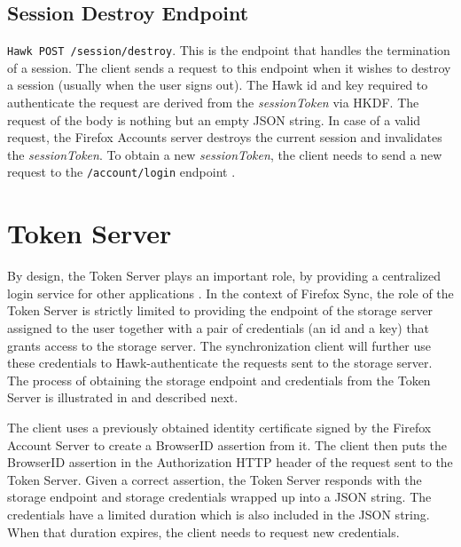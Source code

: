 \subsection{Session Destroy Endpoint}
\label{sub-sec:session-destroy-endpoint}

{\tt Hawk POST /session/destroy}. This is the endpoint that handles the termination of a session. The client sends a request to this endpoint when it wishes to destroy a session (usually when the user signs out). The Hawk id and key required to authenticate the request are derived from the \textit{sessionToken} via HKDF. The request of the body is nothing but an empty JSON string. In case of a valid request, the Firefox Accounts server destroys the current session and invalidates the \textit{sessionToken}. To obtain a new \textit{sessionToken}, the client needs to send a new request to the {\tt/account/login} endpoint \cite{fxa-server-docs}.

\section{Token Server}
\label{sec:token-server}

By design, the Token Server plays an important role, by providing a centralized login service for other applications \cite{token-server-docs}. In the context of Firefox Sync, the role of the Token Server is strictly limited to providing the endpoint of the storage server assigned to the user together with a pair of credentials (an id and a key) that grants access to the storage server. The synchronization client will further use these credentials to Hawk-authenticate the requests sent to the storage server. The process of obtaining the storage endpoint and credentials from the Token Server is illustrated in  and described next.


The client uses a previously obtained identity certificate signed by the Firefox Account Server to create a BrowserID assertion from it. The client then puts the BrowserID assertion in the Authorization HTTP header of the request sent to the Token Server. Given a correct assertion, the Token Server responds with the storage endpoint and storage credentials wrapped up into a JSON string. The credentials have a limited duration which is also included in the JSON string. When that duration expires, the client needs to request new credentials.

